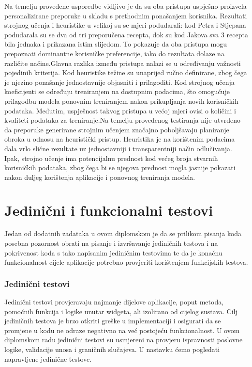 \documentclass[diplomskirad]{fer}
\begin{document}
Na temelju provedene usporedbe vidljivo je da su oba pristupa uspješno proizvela personalizirane preporuke u skladu s prethodnim ponašanjem korisnika. Rezultati strojnog učenja i heuristike u velikoj su se mjeri podudarali: kod Petra i Stjepana podudarala su se dva od tri preporučena recepta, dok su kod Jakova sva 3 recepta bila jednaka i prikazana istim slijedom. To pokazuje da oba pristupa mogu prepoznati dominantne korisničke preferencije, iako do rezultata dolaze na različite načine.Glavna razlika između pristupa nalazi se u određivanju važnosti pojedinih kriterija. Kod heuristike težine su unaprijed ručno definirane, zbog čega je njezino ponašanje jednostavnije objasniti i prilagoditi. Kod strojnog učenja koeficijenti se određuju treniranjem na dostupnim podacima, što omogućuje prilagodbu modela ponovnim treniranjem nakon prikupljanja novih korisničkih podataka. Međutim, uspješnost takvog pristupa u većoj mjeri ovisi o količini i kvaliteti podataka za treniranje.Na temelju provedenog testiranja nije utvrđeno da preporuke generirane strojnim učenjem značajno poboljšavaju planiranje obroka u odnosu na heuristički pristup. Heuristika je na korištenim podacima dala vrlo slične rezultate uz jednostavniji i transparentniji način odlučivanja. Ipak, strojno učenje ima potencijalnu prednost kod većeg broja stvarnih korisničkih podataka, zbog čega bi se njegova prednost mogla jasnije pokazati nakon duljeg korištenja aplikacije i ponovnog treniranja modela.




\section{Jedinični i funkcionalni testovi}

Jedan od dodatnih zadataka u ovom diplomskom je da se prilikom pisanja koda posebna pozornost obrati na pisanje i izvršavanje jediničnih testova i na pokrivenost koda s tako napisanim jediničnim testovima te da je konačnu funkcionalnost cijele aplikacije potrebno provjeriti korištenjem funkcijskih testova. 

\subsubsection{Jedinični testovi}
Jedinični testovi provjeravaju najmanje dijelove aplikacije, poput metoda, pomoćnih funkcija i logike unutar widgeta, ali izolirano od cijelog sustava. Cilj jediničnih testova je brzo otkriti greške u implementaciji i osigurati da se promjene u kodu ne odraze negativno na već postojeću funkcionalnost. U ovom diplomskom radu jedinični testovi su usmjereni na provjeru ispravnosti poslovne logike, validacije unosa i graničnih slučajeva. U nastavku ćemo pogledati napravljene jedinične testove.
\end{document}
